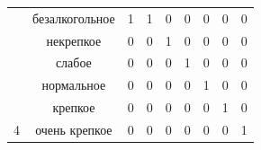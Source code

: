 \begin{table}[H]
\begin{center}
\begin{tabular}{|c|c|ccccccc|}
		{\color[HTML]{333333} }                                                    & безалкогольное                                 & \multicolumn{1}{c|}{1}                        & \multicolumn{1}{c|}{1}                        & \multicolumn{1}{c|}{0}     & \multicolumn{1}{c|}{0}      & \multicolumn{1}{c|}{0}      & \multicolumn{1}{c|}{0}        & \multicolumn{1}{c|}{0}  \\ \cline{2-9}
		{\color[HTML]{333333} }                                                    & {\color[HTML]{333333} некрепкое}    & \multicolumn{1}{c|}{{\color[HTML]{333333} 0}} & \multicolumn{1}{c|}{{\color[HTML]{333333} 0}} & \multicolumn{1}{c|}{1}     & \multicolumn{1}{c|}{0}      & \multicolumn{1}{c|}{0}      & \multicolumn{1}{c|}{0}        & \multicolumn{1}{c|}{0}                       \\ \cline{2-9}
		{\color[HTML]{333333} }                                                    & {\color[HTML]{333333} слабое}    & \multicolumn{1}{c|}{{\color[HTML]{333333} 0}} & \multicolumn{1}{c|}{{\color[HTML]{333333} 0}} & \multicolumn{1}{c|}{0}     & \multicolumn{1}{c|}{1}   & \multicolumn{1}{c|}{0}      & \multicolumn{1}{c|}{0}        & \multicolumn{1}{c|}{0}                       \\ \cline{2-9}
		{\color[HTML]{333333} }                                                    & {\color[HTML]{333333} нормальное}             & \multicolumn{1}{c|}{{\color[HTML]{333333} 0}} & \multicolumn{1}{c|}{{\color[HTML]{333333} 0}} & \multicolumn{1}{c|}{0}     & \multicolumn{1}{c|}{0}      & \multicolumn{1}{c|}{1}      & \multicolumn{1}{c|}{0}        & \multicolumn{1}{c|}{0}                       \\ \cline{2-9}
		{\color[HTML]{333333} }                                                    & {\color[HTML]{333333} крепкое}       & \multicolumn{1}{c|}{{\color[HTML]{333333} 0}} & \multicolumn{1}{c|}{{\color[HTML]{333333} 0}} & \multicolumn{1}{c|}{0}     & \multicolumn{1}{c|}{0}      & \multicolumn{1}{c|}{0}      & \multicolumn{1}{c|}{1}        & \multicolumn{1}{c|}{0}                       \\ \cline{2-9}
		\multirow{-6}{*}{{\color[HTML]{333333} 4}}                                 & {\color[HTML]{333333} очень крепкое  } & \multicolumn{1}{c|}{{\color[HTML]{333333} 0}} & \multicolumn{1}{c|}{{\color[HTML]{333333} 0}} & \multicolumn{1}{c|}{0}     & \multicolumn{1}{c|}{0}      & \multicolumn{1}{c|}{0}      & \multicolumn{1}{c|}{0}        & \multicolumn{1}{c|}{1}                       \\ \cline{1-9}

\end{tabular}
\end{center}
\end{table}
